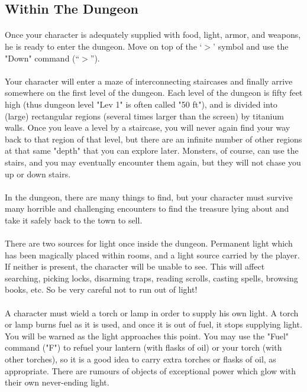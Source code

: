 \subsection{Within The Dungeon}
\paragraph{}Once your character is adequately supplied with food, light, armor, and
weapons, he is ready to enter the dungeon. Move on top of the `$>$' symbol
and use the "Down" command (``$>$'').

\paragraph{}Your character will enter a maze of interconnecting staircases and finally
arrive somewhere on the first level of the dungeon. Each level of the
dungeon is fifty feet high (thus dungeon level "Lev 1" is often called
"50 ft"), and is divided into (large) rectangular regions (several times
larger than the screen) by titanium walls. Once you leave a level by a
staircase, you will never again find your way back to that region of that
level, but there are an infinite number of other regions at that same "depth"
that you can explore later. Monsters, of course, can use the stairs,
and you may eventually encounter them again, but they will not chase you up
or down stairs.

\paragraph{}In the dungeon, there are many things to find, but your
character must survive many horrible and challenging encounters to find
the treasure lying about and take it safely back to the town to sell.

\paragraph{}There are two sources for light once inside the dungeon.
Permanent light which has been magically placed within rooms, and a
light source carried by the player. If neither is present, the character
will be unable to see.  This will affect searching, picking locks,
disarming traps, reading scrolls, casting spells, browsing books, etc.
So be very careful not to run out of light!

\paragraph{}A character must wield a torch or lamp in order to supply
his own light. A torch or lamp burns fuel as it is used, and once it is
out of fuel, it stops supplying light. You will be warned as the light
approaches this point.  You may use the "Fuel" command ("F") to refuel
your lantern (with flasks of oil) or your torch (with other torches), so
it is a good idea to carry extra torches or flasks of oil, as
appropriate. There are rumours of objects of exceptional power which
glow with their own never-ending light.

